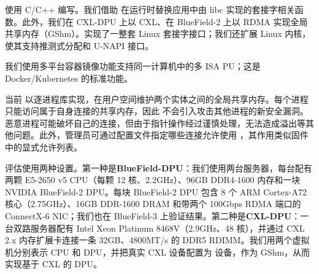 \gsocket 使用 C/C++ 编写。我们借助 \cite{ld-preload}在运行时替换应用中由 libc 实现的套接字相关函数。此外，我们在 CXL-DPU 上以 CXL、在 BlueField-2 上以 RDMA 实现全局共享内存（GShm）。\gsocket 实现了一整套 Linux 套接字接口；我们还扩展 Linux 内核，使其支持推测式分配和 U-NAPI 接口。

我们使用多平台容器镜像功能\cite{multi-platform}支持同一计算机中的多 ISA PU；这是 Docker/Kubernetes 的标准功能。

当前 \os 以逐进程库实现，在用户空间维护两个实体之间的全局共享内存。每个进程只能访问属于自身连接的共享内存，因此 \os 不会引入攻击其他进程的新安全漏洞。恶意进程可能破坏自己的连接，但由于指针操作经过谨慎处理，无法造成溢出等其他问题。此外，管理员可通过配置文件指定哪些连接允许使用 \gsocket，其作用类似固件中的显式允许列表。

评估使用两种设置。第一种是\textbf{BlueField-DPU}：我们使用两台服务器，每台配有两颗 E5-2650 v5 CPU（每颗 12 核、2.2GHz）、96GB DDR4-1600 内存和一块 NVIDIA BlueField-2 DPU。每块 BlueField-2 DPU 包含 8 个 ARM Cortex-A72 核心（2.75GHz）、16GB DDR-1600 DRAM 和带两个 100Gbps RDMA 端口的 ConnectX-6 NIC；我们也在 BlueField-3 上验证结果。第二种是\textbf{CXL-DPU}：一台双路服务器配有 Intel Xeon Platinum 8468V（2.9GHz、48 核），并通过 CXL 2.x 内存扩展卡连接一条 32GB、4800MT/s 的 DDR5 RDIMM。我们用两个虚拟机分别表示 CPU 和 DPU，并把真实 CXL 设备配置为  设备，作为 GShm，从而实现基于 CXL 的 DPU。
